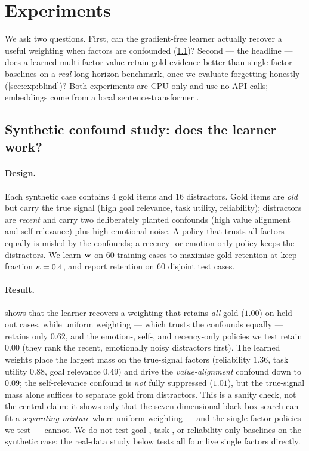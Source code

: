 \section{Experiments}
\label{sec:exp}

We ask two questions. First, can the gradient-free learner actually
recover a useful weighting when factors are confounded
(\cref{sec:exp:synth})? Second --- the headline --- does a learned
multi-factor value retain gold evidence better than single-factor
baselines on a \emph{real} long-horizon benchmark, once we evaluate
forgetting honestly (\cref{sec:exp:blind})? Both experiments are
CPU-only and use no API calls; embeddings come from a local
sentence-transformer \citep{reimers2019sbert}.

\subsection{Synthetic confound study: does the learner work?}
\label{sec:exp:synth}

\paragraph{Design.}
Each synthetic case contains $4$ gold items and $16$ distractors. Gold
items are \emph{old} but carry the true signal (high goal relevance,
task utility, reliability); distractors are \emph{recent} and carry two
deliberately planted confounds (high value alignment and self relevance)
plus high emotional noise. A policy that trusts all factors equally is
misled by the confounds; a recency- or emotion-only policy keeps the
distractors. We learn $\mathbf{w}$ on $60$ training cases to maximise
gold retention at keep-fraction $\kappa=0.4$, and report retention on
$60$ disjoint test cases.

\paragraph{Result.}
 shows that the learner recovers a weighting that retains
\emph{all} gold ($1.00$) on held-out cases, while uniform weighting ---
which trusts the confounds equally --- retains only $0.62$, and
the emotion-, self-, and recency-only policies we test retain $0.00$
(they rank the recent, emotionally noisy distractors first). The learned
weights place the largest mass on the true-signal factors (reliability
$1.36$, task utility $0.88$, goal relevance $0.49$) and drive the
\emph{value-alignment} confound down to $0.09$; the self-relevance
confound is \emph{not} fully suppressed ($1.01$), but the true-signal mass
alone suffices to separate gold from distractors. This is a sanity check,
not the central claim: it shows only that the seven-dimensional black-box
search can fit a \emph{separating mixture} where uniform weighting --- and
the single-factor policies we test --- cannot. We do not test goal-,
task-, or reliability-only baselines on the synthetic case; the real-data
study below tests all four live single factors directly.

